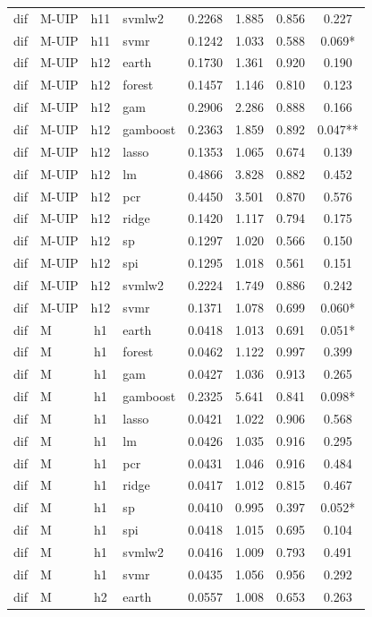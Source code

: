 \begin{ThreePartTable}
\begin{longtable}[t]{llclcccc}
dif & M-UIP & h11 & svmlw2 & 0.2268 & 1.885 & 0.856 & 0.227\\
dif & M-UIP & h11 & svmr & 0.1242 & 1.033 & 0.588 & 0.069*\\
\addlinespace
dif & M-UIP & h12 & earth & 0.1730 & 1.361 & 0.920 & 0.190\\
dif & M-UIP & h12 & forest & 0.1457 & 1.146 & 0.810 & 0.123\\
dif & M-UIP & h12 & gam & 0.2906 & 2.286 & 0.888 & 0.166\\
dif & M-UIP & h12 & gamboost & 0.2363 & 1.859 & 0.892 & 0.047**\\
dif & M-UIP & h12 & lasso & 0.1353 & 1.065 & 0.674 & 0.139\\
dif & M-UIP & h12 & lm & 0.4866 & 3.828 & 0.882 & 0.452\\
dif & M-UIP & h12 & pcr & 0.4450 & 3.501 & 0.870 & 0.576\\
dif & M-UIP & h12 & ridge & 0.1420 & 1.117 & 0.794 & 0.175\\
dif & M-UIP & h12 & sp & 0.1297 & 1.020 & 0.566 & 0.150\\
dif & M-UIP & h12 & spi & 0.1295 & 1.018 & 0.561 & 0.151\\
dif & M-UIP & h12 & svmlw2 & 0.2224 & 1.749 & 0.886 & 0.242\\
dif & M-UIP & h12 & svmr & 0.1371 & 1.078 & 0.699 & 0.060*\\
\addlinespace
dif & M & h1 & earth & 0.0418 & 1.013 & 0.691 & 0.051*\\
dif & M & h1 & forest & 0.0462 & 1.122 & 0.997 & 0.399\\
dif & M & h1 & gam & 0.0427 & 1.036 & 0.913 & 0.265\\
dif & M & h1 & gamboost & 0.2325 & 5.641 & 0.841 & 0.098*\\
dif & M & h1 & lasso & 0.0421 & 1.022 & 0.906 & 0.568\\
dif & M & h1 & lm & 0.0426 & 1.035 & 0.916 & 0.295\\
dif & M & h1 & pcr & 0.0431 & 1.046 & 0.916 & 0.484\\
dif & M & h1 & ridge & 0.0417 & 1.012 & 0.815 & 0.467\\
dif & M & h1 & sp & 0.0410 & 0.995 & 0.397 & 0.052*\\
dif & M & h1 & spi & 0.0418 & 1.015 & 0.695 & 0.104\\
dif & M & h1 & svmlw2 & 0.0416 & 1.009 & 0.793 & 0.491\\
dif & M & h1 & svmr & 0.0435 & 1.056 & 0.956 & 0.292\\
\addlinespace
dif & M & h2 & earth & 0.0557 & 1.008 & 0.653 & 0.263\\

\end{longtable}
\end{ThreePartTable}
